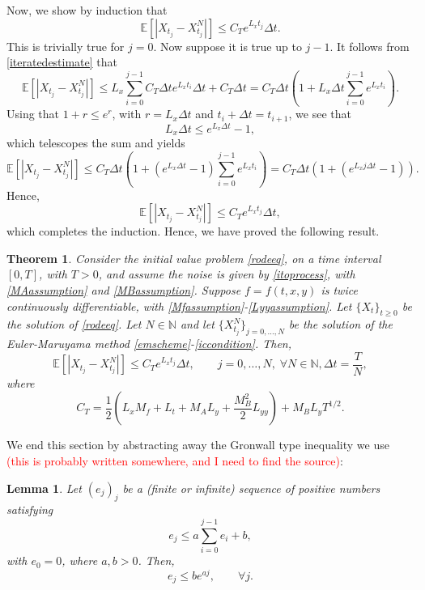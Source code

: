 \documentclass[reqno,12pt]{amsart}
\theoremstyle{plain}%
\newtheorem{thm}{Theorem}[section]
\newtheorem{lem}{Lemma}[section]
\theoremstyle{definition}
\begin{document}
Now, we show by induction that
$$
 \mathbb{E}\left[| X_{t_j} - X_{t_j}^N |\right] \leq C_T e^{L_x t_j}\Delta t .
$$
This is trivially true for $j=0$. Now suppose it is true up to $j-1$. It follows from \eqref{iteratedestimate} that
$$
 \mathbb{E}\left[| X_{t_j} - X_{t_j}^N |\right] \leq L_x \sum_{i=0}^{j-1} C_T \Delta t e^{L_x t_i}\Delta t + C_T \Delta t = C_T \Delta t\left( 1 + L_x \Delta t \sum_{i=0}^{j-1}  e^{L_x t_i} \right).
$$
Using that $1 + r \leq e^r$, with $r=L_x\Delta t$ and $t_i + \Delta t = t_{i+1}$, we see that
$$
L_x \Delta t \leq e^{L_x \Delta t} - 1,
$$
which telescopes the sum and yields
$$
 \mathbb{E}\left[| X_{t_j} - X_{t_j}^N |\right] \leq C_T \Delta t\left( 1 + (e^{L_x \Delta t} - 1)\sum_{i=0}^{j-1}  e^{L_x t_i} \right) = C_T \Delta t  \left(1 + (e^{L_x j\Delta t} - 1) \right).
$$
Hence,
$$
 \mathbb{E}\left[| X_{t_j} - X_{t_j}^N |\right] \leq C_T e^{L_x t_j}\Delta t ,
$$
which completes the induction. Hence, we have proved the following result.

\begin{thm}
  \label{EMstrongorder1}
  Consider the initial value problem \eqref{rodeeq}, on a time interval $[0, T]$, with $T > 0$, and assume the noise is given by \eqref{itoprocess}, with \eqref{MAassumption} and \eqref{MBassumption}. Suppose $f=f(t, x, y)$ is twice continuously differentiable, with \eqref{Mfassumption}-\eqref{Lyyassumption}. Let $\{X_t\}_{t\geq 0}$ be the solution of \eqref{rodeeq}. Let $N\in \mathbb{N}$ and let $\{X_{t_j}^N\}_{j=0, \ldots, N}$ be the solution of the Euler-Maruyama method \eqref{emscheme}-\eqref{iccondition}. Then,
  \begin{equation}
  \mathbb{E}\left[ \left| X_{t_j} - X_{t_j}^N \right| \right] \leq C_T e^{L_x t_j} \Delta t, \qquad j = 0, \ldots, N, \;\forall N \in \mathbb{N},  \Delta t = \frac{T}{N},
\end{equation}
  where
  \begin{equation}
    C_T = \frac{1}{2}\left(L_x M_f + L_t + M_A L_y  + \frac{M_B^2}{2}L_{yy} \right) + M_B L_yT^{1/2}.
  \end{equation}
\end{thm}

We end this section by abstracting away the Gronwall type inequality we use \textcolor{red}{(this is probably written somewhere, and I need to find the source)}:
\begin{lem}
Let $(e_j)_j$ be a (finite or infinite) sequence of positive numbers satisfying
\begin{equation}
  \label{integralgronwall}
  e_j \leq a \sum_{i=0}^{j-1} e_i + b,
\end{equation}
with $e_0 = 0$, where $a, b > 0$. Then,
\begin{equation}
  \label{estimateintegralgronwall}
  e_j \leq b e^{aj}, \qquad \forall j.
\end{equation}
\end{lem}
\end{document}
